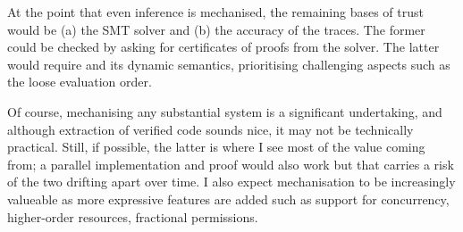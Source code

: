 At the point that even inference is mechanised, the remaining bases of trust
would be (a) the SMT solver and (b) the accuracy of the traces. The former could be
checked  by asking for certificates of proofs from the solver. The latter would require  and
its dynamic semantics, prioritising challenging aspects such as the loose
evaluation order.

Of course, mechanising any substantial system is a significant undertaking, and
although extraction of verified code sounds nice, it may not be technically
practical. Still, if possible, the latter is where I see most of the value
coming from; a parallel implementation and proof would also work but that
carries a risk of the two drifting apart over time. I also expect mechanisation
to be increasingly valueable as more expressive features are added such as support
for concurrency, higher-order resources, fractional permissions.

